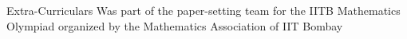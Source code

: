 \begin{rubric}{Extra-Curriculars}
	\entry*[2024] Was part of the paper-setting team for the IITB Mathematics Olympiad organized by the Mathematics Association of IIT Bombay
\end{rubric}
